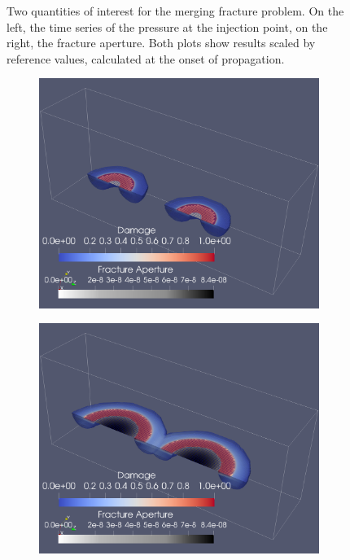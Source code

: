 \begin{figure}[h]
\noindent
\hspace{0.5cm}

\caption{Two quantities of interest for the merging fracture problem. On the left, the time series of the pressure at the injection point, on the right, the fracture aperture. Both plots show results scaled by reference values, calculated at the onset of propagation.}  
\label{fig:merging_charts}
\end{figure}


\begin{figure}[h]
\begin{subfigure}{.45\textwidth}
  \centering
  \includegraphics[width=\linewidth]{Chapter4/figures/merging/merge_t_1(1).png}
  \caption{}
  \label{fig:merge_t_0}
\end{subfigure}%
\hspace{1cm}
\begin{subfigure}{.45\textwidth}
  \centering
  \includegraphics[width=\linewidth]{Chapter4/figures/merging/merge_t_17(1).png}
  \caption{}
  \label{fig:merge_t_1}
\end{subfigure}%


\end{figure}
